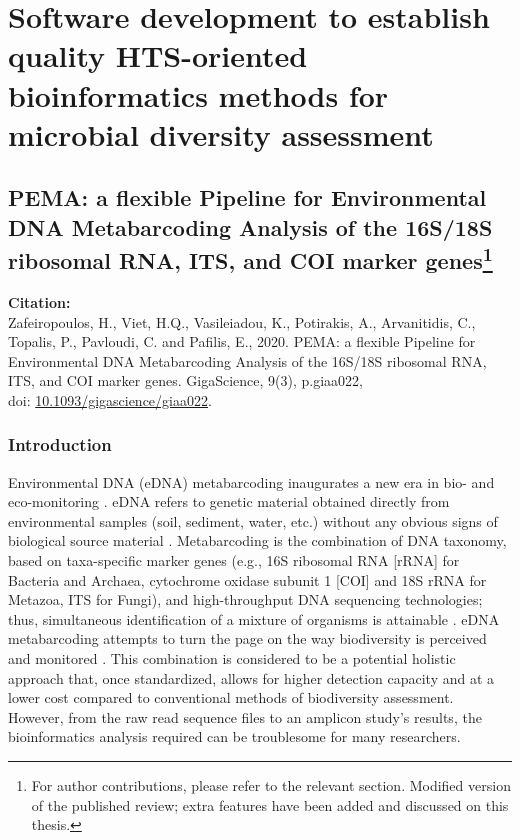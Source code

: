 % 
% 

\chapter{Software development to establish quality HTS-oriented bioinformatics methods for microbial diversity assessment}
\label{cha:2}


% 
% 
\section[PEMA: a flexible Pipeline for Environmental DNA Metabarcoding Analysis of the 16S/18S ribosomal RNA, ITS, and COI marker genes]{
   PEMA: a flexible Pipeline for Environmental DNA Metabarcoding Analysis of the 16S/18S ribosomal RNA, ITS, and COI marker genes\footnote{For author contributions, please refer to the relevant section. Modified version of the published review; extra features have been added and discussed on this thesis.}
}

   \textbf{Citation:} \\ 
   Zafeiropoulos, H., Viet, H.Q., Vasileiadou, K., Potirakis, A., Arvanitidis, C., Topalis, P., Pavloudi, C. and Pafilis, E., 2020. PEMA: a flexible Pipeline for Environmental DNA Metabarcoding Analysis of the 16S/18S ribosomal RNA, ITS, and COI marker genes. GigaScience, 9(3), p.giaa022, \\ 
   doi: \href{https://doi.org/10.1093/gigascience/giaa022}{10.1093/gigascience/giaa022}.


   \subsection{Introduction}

   Environmental DNA (eDNA) metabarcoding inaugurates a new era in bio- and eco-monitoring \citep{pavan2015dna}. 
   eDNA refers to genetic material obtained directly from environmental samples (soil, sediment, water, etc.) without any obvious signs of biological source material \citep{thomsen2015environmental}. 
   Metabarcoding is the combination of DNA taxonomy, based on taxa-specific marker genes (e.g., 16S ribosomal RNA [rRNA] for Bacteria and Archaea, cytochrome oxidase subunit 1 [COI] and 18S rRNA for Metazoa, ITS for Fungi), and high-throughput DNA sequencing technologies; thus, simultaneous identification of a mixture of organisms is attainable \citep{ji2013reliable}. 
   eDNA metabarcoding attempts to turn the page on the way biodiversity is perceived and monitored \citep{ji2013reliable}. 
   This combination is considered to be a potential holistic approach that, once standardized, allows for higher detection capacity and at a lower cost compared to conventional methods of biodiversity assessment. 
   However, from the raw read sequence files to an amplicon study's results, the bioinformatics analysis required can be troublesome for many researchers.

